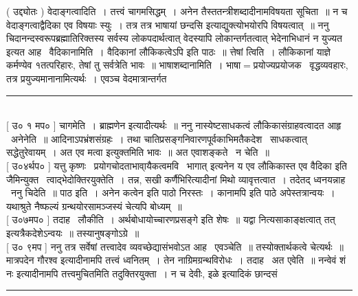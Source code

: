 \documentclass[11pt, openany]{book}
\begin{document}
\begin{multicols}{2}
 ( उद्द्योतः ) वेदाङ्गत्वादिति~। तत्त्वं चागमसिद्धम्~। अनेन तैस्ततन्त्रीशब्दादीनामविषयता सूचिता~॥ न च वेदाङ्गत्वाद्वैदिका एव विषयाः स्युः~। तत्र तत्र {\qt भाषायां छन्दसि} इत्याद्युक्त्योभयोरपि विषयत्वात्~॥ ननु चिदानन्दस्वरूपब्रह्मातिरिक्तस्य सर्वस्य लोकपदार्थत्वात् वेदस्यापि लोकान्तर्गतत्वात् भेदेनाभिधानं न युज्यत इत्यत आह \textendash\ वैदिकानामिति~। {\qt वैदिकानां लौकिकत्वेऽपि इति पाठः}~॥ त्तेषां त्विति~। लौकिकानां याज्ञे कर्मण्येव १तत्परिहारः, तेषां तु सर्वत्रेति भावः~॥ भाषाशब्दानामिति~। भाषा$=$प्रयोज्यप्रयोजक \textendash\ वृद्धव्यवहारः, तत्र प्रयुज्यमानानामित्यर्थः~। एवञ्च वेदमात्रान्तर्गत \textendash\

\noindent
\rule{1\linewidth}{0.5pt}\\

 [ उ० १ मप० ] चागमेति~। {\qt ब्राह्मणेन} इत्यादीत्यर्थः~॥ ननु नास्येष्टसाधकत्वं लौकिकासंग्राहवत्वादत आहृ \textendash\ अनेनेति~॥ आदिनाऽपभ्रंशसंग्रहः~। तथा चातिप्रसङ्गनिवारणपूर्वकाभिमतैकदेश \textendash\ साधकत्वात् सद्धेतुरेवायम्~। अत एव {\qt मत्वा} इत्युक्तमिति भावः~॥ अत एवाशङ्कते \textendash\ न चेति~॥\\

 [ उ०४र्थप० ] यत्तु कृष्णः \textendash\ {\qt प्रयोगचोदताभावा्यैकत्वमवि \textendash\ भागात्} इत्यनेन य एव लौकिकास्त एव वैदिका इति जैमिन्युक्त \textendash\ त्वाद्भेदोक्तिरयुक्तेति~। तन्न, सखी कर्णैभिरित्यादीनां मिथो व्यावृत्तत्वात~। तदेतद् ध्वनयन्नाह \textendash\ ननु चिदेति~॥ पाठ इति~। अनेन {\qt कत्वेन} इति पाठो निरस्तः~। {\qt कानामपि} इति पाठे अपेस्तत्रान्वयः~। यथाश्रुते नैष्फल्यं ग्रन्थयोरसामञ्जस्यं चेत्यपि बोध्यम्~॥\\

 [ उ०७मप० ] तदाह \textendash\ लौकीति~। अर्थबोधायोच्चारणप्रसङ्गे इति शेषः~॥ यद्वा नित्यसाकाङ्क्षत्वात् {\qt तत्} इत्यत्रैकदेशेऽन्वयः~॥ तस्यानुषङ्गोऽग्रे~॥\\

 [ उ० ९मप ] ननु तत्र सर्वेषां तत्त्वादेव व्यवच्छेद्यासंभवोऽत आह \textendash\ एवञ्चेति~॥ तस्योक्तार्थकत्वे चेत्यर्थः~॥ मात्रपदेन गौरश्व इत्यादीनामपि तत्त्वं ध्वनितम्~। तेन नाग्रिमग्रन्थविरोधः~। तदाह \textendash\ अत एवेति~॥ नन्वेवं शं नः इत्यादीनामपि तत्त्वमुचितमिति तदुक्तिरयुक्ता~। न च {\qt देवीः, इळे} इत्यादिकं छान्दसं

\noindent
\rule{1\linewidth}{0.5pt}\\


\end{multicols}
\end{document}
